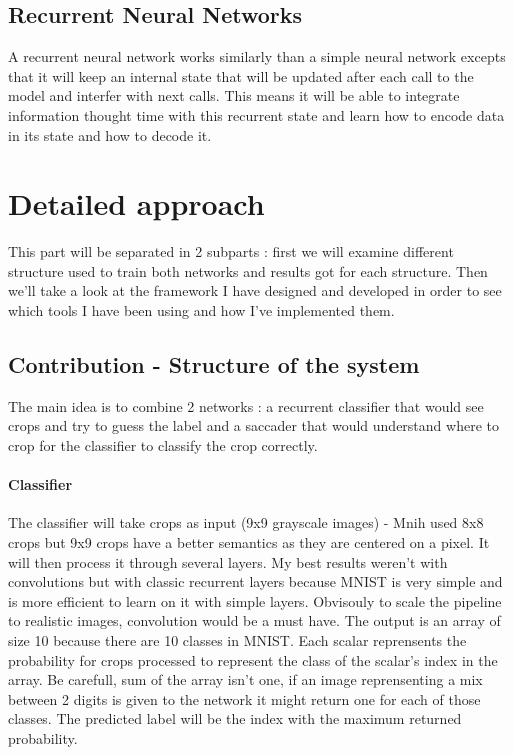 \documentclass[11pt]{article}
\begin{document}
\subsection{Recurrent Neural Networks}
A recurrent neural network works similarly than a simple neural network excepts that it will keep an internal state that will be updated after each call to the model and interfer with next calls. This means it will be able to integrate information thought time with this recurrent state and learn how to encode data in its state and how to decode it.

\section{Detailed approach}
This part will be separated in 2 subparts : first we will examine different structure used to train both networks and results got for each structure. Then we'll take a look at the framework I have designed and developed in order to see which tools I have been using and how I've implemented them.


\subsection{Contribution - Structure of the system}
The main idea is to combine 2 networks : a recurrent classifier that would see crops and try to guess the label and a saccader that would understand where to crop for the classifier to classify the crop correctly.

\paragraph{Classifier}
The classifier will take crops as input (9x9 grayscale images) - Mnih used 8x8 crops but 9x9 crops have a better semantics as they are centered on a pixel. It will then process it through several layers. My best results weren't with convolutions but with classic recurrent layers because MNIST is very simple and is more efficient to learn on it with simple layers. Obvisouly to scale the pipeline to realistic images, convolution would be a must have. The output is an array of size 10 because there are 10 classes in MNIST. Each scalar reprensents the probability for crops processed to represent the class of the scalar's index in the array. Be carefull, sum of the array isn't one, if an image reprensenting a mix between 2 digits is given to the network it might return one for each of those classes. The predicted label will be the index with the maximum returned probability.
\end{document}
